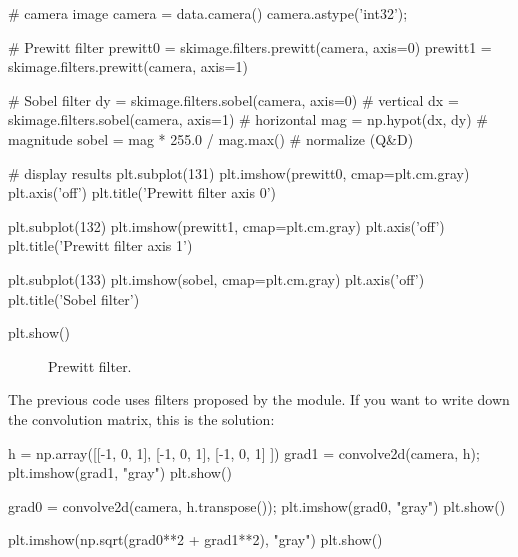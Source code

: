 \begin{python}
# camera image
camera = data.camera()
camera.astype('int32');

# Prewitt filter
prewitt0 = skimage.filters.prewitt(camera, axis=0)
prewitt1 = skimage.filters.prewitt(camera, axis=1)

# Sobel filter
dy = skimage.filters.sobel(camera, axis=0) # vertical
dx = skimage.filters.sobel(camera, axis=1) # horizontal
mag = np.hypot(dx, dy)  # magnitude
sobel = mag * 255.0 / mag.max()  # normalize (Q&D)

# display results
plt.subplot(131)
plt.imshow(prewitt0, cmap=plt.cm.gray)
plt.axis('off')
plt.title('Prewitt filter axis 0')

plt.subplot(132)
plt.imshow(prewitt1, cmap=plt.cm.gray)
plt.axis('off')
plt.title('Prewitt filter axis 1')

plt.subplot(133)
plt.imshow(sobel, cmap=plt.cm.gray)
plt.axis('off')
plt.title('Sobel filter')

plt.show()
\end{python}

\begin{figure}[H]
\centering\caption{Prewitt filter.}
\hspace{1.5cm}
\label{fig:introduction:python:prewitt}
\end{figure}

The previous code uses filters proposed by the  module. If you want to write down the convolution matrix, this is the solution:
\begin{python}
h = np.array([[-1, 0, 1], [-1, 0, 1], [-1, 0, 1] ])
grad1 = convolve2d(camera, h);
plt.imshow(grad1, "gray")
plt.show()

grad0 = convolve2d(camera, h.transpose());
plt.imshow(grad0, "gray")
plt.show()

plt.imshow(np.sqrt(grad0**2 + grad1**2), "gray")
plt.show()
\end{python}


